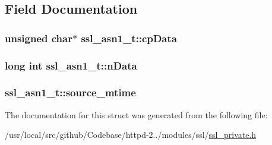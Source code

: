 \subsection{Field Documentation}
\subsubsection[{\texorpdfstring{cp\+Data}{cpData}}]{\setlength{\rightskip}{0pt plus 5cm}unsigned char$\ast$ ssl\+\_\+asn1\+\_\+t\+::cp\+Data}\hypertarget{structssl__asn1__t_afa73bf65f652bd8d4bbc5e2a63353877}{}\label{structssl__asn1__t_afa73bf65f652bd8d4bbc5e2a63353877}
\subsubsection[{\texorpdfstring{n\+Data}{nData}}]{\setlength{\rightskip}{0pt plus 5cm}long {\bf int} ssl\+\_\+asn1\+\_\+t\+::n\+Data}\hypertarget{structssl__asn1__t_ab6aba132c3ebc21c380618c9d49f6ebe}{}\label{structssl__asn1__t_ab6aba132c3ebc21c380618c9d49f6ebe}
\subsubsection[{\texorpdfstring{source\+\_\+mtime}{source_mtime}}]{ ssl\+\_\+asn1\+\_\+t\+::source\+\_\+mtime}\hypertarget{structssl__asn1__t_aae73a4b4725a985d1cdc4dbb8da0a049}{}\label{structssl__asn1__t_aae73a4b4725a985d1cdc4dbb8da0a049}


The documentation for this struct was generated from the following file\+:\begin{DoxyCompactItemize}
\item 
/usr/local/src/github/\+Codebase/httpd-\/2../modules/ssl/\hyperlink{ssl__private_8h}{ssl\+\_\+private.\+h}\end{DoxyCompactItemize}

